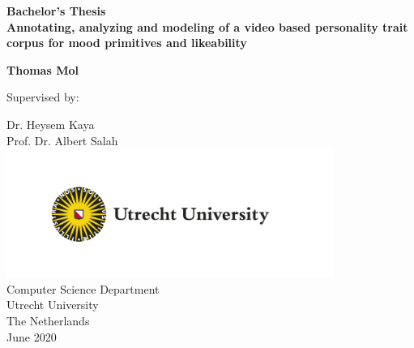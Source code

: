 \begin{titlepage}
    \begin{center}
        \vspace*{1.0cm}
        
        \Huge
        \textsf{
            \textbf{Bachelor's Thesis}
        } \\
        \vspace{1cm}
        \LARGE
            \textbf{Annotating, analyzing and modeling of a video based personality trait corpus for mood primitives and likeability}

        \vspace{2cm}
        
        \Large
        \textbf{Thomas Mol} \\
        \vfill
        
     
        \vspace{1cm}
        
        \large
        Supervised by: \\
        \vspace{6pt}
        
        \Large
        Dr. Heysem Kaya\\
        Prof. Dr. Albert Salah\\
        
        \includegraphics[width=0.8\textwidth]{Images/UU_logo_EN_CMYK.png}\\
        
        \large
        Computer Science Department \\
        Utrecht University \\
        The Netherlands\\
        June 2020\\
        
    \end{center}
\end{titlepage}